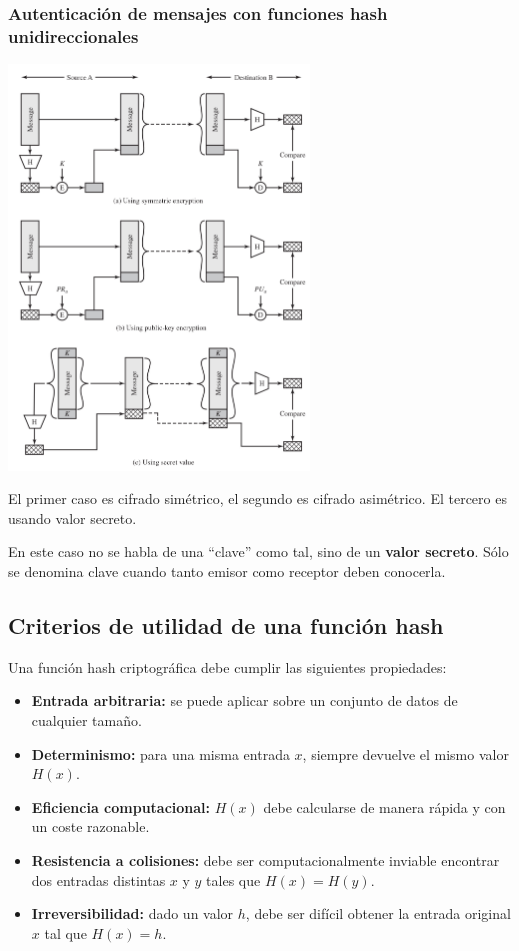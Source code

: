 \documentclass[11pt,a4paper]{article}
\begin{document}
\subsubsection*{Autenticación de mensajes con funciones hash unidireccionales}
\begin{center}
    \includegraphics[width=0.6\textwidth]{resources/Hash_Unidirectional.png}
\end{center}

El primer caso es cifrado simétrico, el segundo es cifrado asimétrico. El tercero es usando valor secreto.

\begin{RecordatorioBox}
En este caso no se habla de una “clave” como tal, sino de un \textbf{valor secreto}.
Sólo se denomina clave cuando tanto emisor como receptor deben conocerla.
\end{RecordatorioBox}

\subsection{Criterios de utilidad de una función hash}

Una función hash criptográfica debe cumplir las siguientes propiedades:

\begin{itemize}
    \item \textbf{Entrada arbitraria:} se puede aplicar sobre un conjunto de datos de cualquier tamaño.
    \item \textbf{Determinismo:} para una misma entrada $x$, siempre devuelve el mismo valor $H(x)$.
    \item \textbf{Eficiencia computacional:} $H(x)$ debe calcularse de manera rápida y con un coste razonable.
    \item \textbf{Resistencia a colisiones:} debe ser computacionalmente inviable encontrar dos entradas distintas $x$ y $y$ tales que $H(x)=H(y)$.
    \item \textbf{Irreversibilidad:} dado un valor $h$, debe ser difícil obtener la entrada original $x$ tal que $H(x)=h$.
\end{itemize}
\end{document}
